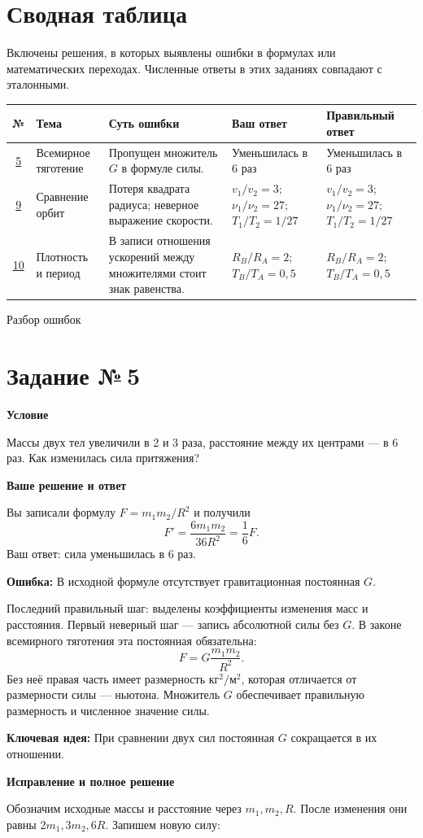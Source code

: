 \documentclass[a4paper,12pt]{article}
\newcommand{\topic}[1]{\par\medskip\textbf{\textcolor{darkaccent}{#1}}\par}
\newcommand{\error}[1]{\par\medskip\textbf{\textcolor{err}{Ошибка:}} #1\par}
\newcommand{\key}[1]{\par\medskip\textbf{\textcolor{blue!60!black}{Ключевая идея:}} #1\par}
\newcommand{\task}[1]{\clearpage\phantomsection\label{task:#1}\section*{Задание №\,#1}}
\begin{document}
\section*{Сводная таблица}
Включены решения, в которых выявлены ошибки в формулах или математических переходах. Численные ответы в этих заданиях совпадают с эталонными.
\par\medskip\noindent
{\renewcommand{\arraystretch}{1.55}\small
\begin{tabularx}{\linewidth}{@{}c >{\raggedright\arraybackslash}p{.17\linewidth} >{\raggedright\arraybackslash}X >{\raggedright\arraybackslash}p{.19\linewidth} >{\raggedright\arraybackslash}p{.19\linewidth}@{}}
\toprule
№ & Тема & Суть ошибки & Ваш ответ & Правильный ответ\\
\midrule
\hyperref[task:5]{5} & Всемирное тяготение & Пропущен множитель $G$ в формуле силы. & Уменьшилась в 6 раз & Уменьшилась в 6 раз\\
\hyperref[task:9]{9} & Сравнение орбит & Потеря квадрата радиуса; неверное выражение скорости. & $v_1/v_2=3$; $\nu_1/\nu_2=27$; $T_1/T_2=1/27$ & $v_1/v_2=3$; $\nu_1/\nu_2=27$; $T_1/T_2=1/27$\\
\hyperref[task:10]{10} & Плотность и период & В записи отношения ускорений между множителями стоит знак равенства. & $R_B/R_A=2$; $T_B/T_A=0{,}5$ & $R_B/R_A=2$; $T_B/T_A=0{,}5$\\
\bottomrule
\end{tabularx}}
\clearpage
\thispagestyle{empty}
\null\vfill\begin{center}{\Huge Разбор ошибок}\end{center}\vfill\null
\task{5}
\topic{Условие}
Массы двух тел увеличили в 2 и 3 раза, расстояние между их центрами --- в 6 раз. Как изменилась сила притяжения?
\topic{Ваше решение и ответ}
Вы записали формулу $F=m_1m_2/R^2$ и получили
\[ F'=\frac{6m_1m_2}{36R^2}=\frac16F. \]
Ваш ответ: сила уменьшилась в 6 раз.
\error{В исходной формуле отсутствует гравитационная постоянная $G$.}
Последний правильный шаг: выделены коэффициенты изменения масс и расстояния. Первый неверный шаг --- запись абсолютной силы без $G$. В законе всемирного тяготения эта постоянная обязательна:
\[ F=G\frac{m_1m_2}{R^2}. \]
Без неё правая часть имеет размерность $\text{кг}^2/\text{м}^2$, которая отличается от размерности силы --- ньютона. Множитель $G$ обеспечивает правильную размерность и численное значение силы.
\key{При сравнении двух сил постоянная $G$ сокращается в их отношении.}
\topic{Исправление и полное решение}
Обозначим исходные массы и расстояние через $m_1,m_2,R$. После изменения они равны $2m_1,3m_2,6R$. Запишем новую силу:
\end{document}
